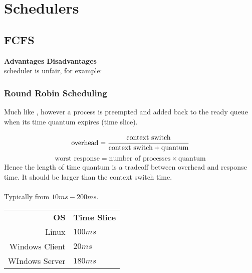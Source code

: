 \documentclass{report}
\begin{document}
\section*{Schedulers}
\subsection*{FCFS}
\textbf{Advantages}
\textbf{Disadvantages}
\\ scheduler is unfair, for example:
\subsubsection*{Round Robin Scheduling}
Much like , however a process is preempted and added back to the ready queue when its time quantum expires (time slice).

\[\text{overhead} = \cfrac{\text{context switch}}{\text{context switch} + \text{quantum}}\]
\[\text{worst response} = \text{number of processes} \times \text{quantum}\]
Hence the length of time quantum is a tradeoff between overhead and response time. It should be larger than the context switch time.
\\
\\ Typically from $10ms - 200ms$.
\begin{center}
	\begin{tabular}{r l}
		\textbf{OS}    & \textbf{Time Slice} \\
		Linux          & $100ms$             \\
		Windows Client & $20ms$              \\
		WIndows Server & $180ms$             \\
	\end{tabular}
\end{center}
\end{document}
